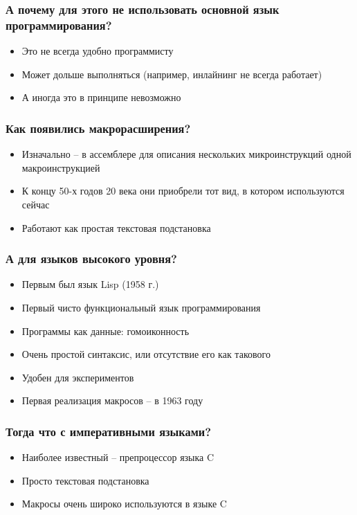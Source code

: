 \documentclass[11pt]{beamer}
\begin{document}
\begin{frame}
\frametitle{А почему для этого не использовать основной язык программирования?}

\begin{itemize}
	\item Это не всегда удобно программисту
	\item Может дольше выполняться (например, инлайнинг не всегда работает)
	\item А иногда это в принципе невозможно
\end{itemize}

\end{frame}

\begin{frame}
\frametitle{Как появились макрорасширения?}

\begin{itemize}
	\item Изначально -- в ассемблере для описания нескольких микроинструкций одной макроинструкцией
	\item К концу 50-х годов 20 века они приобрели тот вид, в котором используются сейчас
	\item Работают как простая текстовая подстановка
\end{itemize}

\end{frame}

\begin{frame}
\frametitle{А для языков высокого уровня?}

\begin{itemize}
	\item Первым был язык Lisp (1958 г.)
	\item Первый чисто функциональный язык программирования
	\item Программы как данные: гомоиконность
	\item Очень простой синтаксис, или отсутствие его как такового
	\item Удобен для экспериментов
	\item Первая реализация макросов -- в 1963 году
\end{itemize}

\end{frame}


\begin{frame}
\frametitle{Тогда что с императивными языками?}

\begin{itemize}
	\item Наиболее известный -- препроцессор языка C
	\item Просто текстовая подстановка
	\item Макросы очень широко используются в языке C
\end{itemize}

\end{frame}
\end{document}
